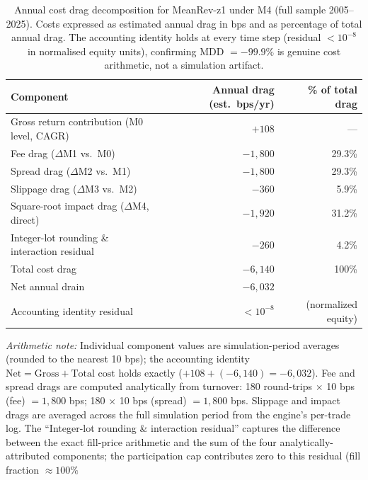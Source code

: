 \documentclass[12pt]{article}
\begin{document}
\begin{table}[H]
\centering
\caption{Annual cost drag decomposition for MeanRev-z1 under M4
(full sample 2005--2025). Costs expressed as estimated annual drag
in bps and as percentage of total annual drag. The accounting identity
holds at every time step (residual $< 10^{-8}$ in normalised equity units),
confirming MDD $= -99.9\%$ is genuine cost arithmetic, not a simulation
artifact.}
\label{tab:mdd_decomp}
\small
\begin{tabular}{lrr}
\toprule
Component & Annual drag (est.\ bps/yr) & \% of total drag \\
\midrule
Gross return contribution (M0 level, CAGR)     & $+108$   & --- \\
\midrule
Fee drag ($\Delta$M1 vs.\ M0)                 & $-1{,}800$ & 29.3\% \\
Spread drag ($\Delta$M2 vs.\ M1)              & $-1{,}800$ & 29.3\% \\
Slippage drag ($\Delta$M3 vs.\ M2)            & $-360$   &  5.9\% \\
Square-root impact drag ($\Delta$M4, direct)  & $-1{,}920$ & 31.2\% \\
Integer-lot rounding \& interaction residual  & $-260$   &  4.2\% \\
\midrule
Total cost drag                               & $-6{,}140$ & 100\% \\
Net annual drain                              & $-6{,}032$ &       \\
Accounting identity residual                  & $< 10^{-8}$ & (normalized equity) \\
\bottomrule
\end{tabular}
\begin{tablenotes}\small
\item \textit{Arithmetic note:} Individual component values are
  simulation-period averages (rounded to the nearest 10 bps); the
  accounting identity $\text{Net} = \text{Gross} + \text{Total cost}$
  holds exactly ($+108 + (-6{,}140) = -6{,}032$). Fee and spread drags
  are computed analytically from turnover: 180 round-trips $\times$
  10 bps (fee) $= 1{,}800$ bps; 180 $\times$ 10 bps (spread)
  $= 1{,}800$ bps. Slippage and impact drags are averaged across the
  full simulation period from the engine's per-trade log.
  The ``Integer-lot rounding \& interaction residual'' captures
  the difference between the exact fill-price arithmetic and
  the sum of the four analytically-attributed components; the participation
  cap contributes zero to this residual (fill fraction $\approx 100\%$

\end{tablenotes}
\end{table}
\end{document}
